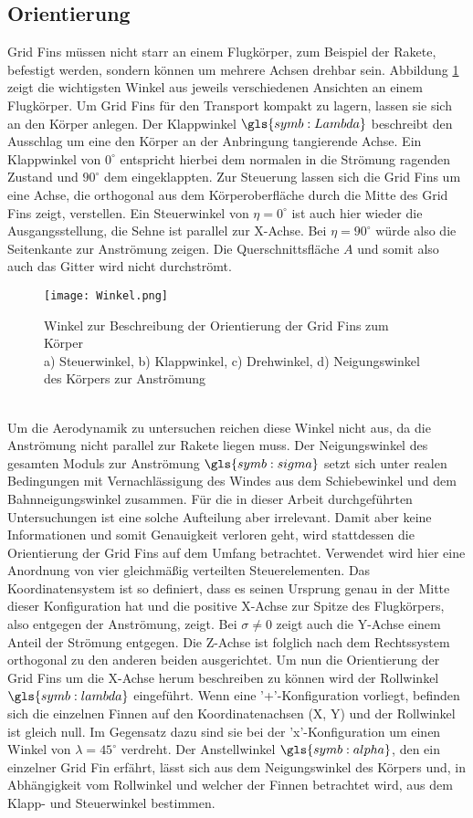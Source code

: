 \subsection{Orientierung}
Grid Fins müssen nicht starr an einem Flugkörper, zum Beispiel der Rakete, befestigt werden, sondern können um mehrere Achsen drehbar sein. Abbildung \ref{abb_winkel} zeigt die wichtigsten Winkel aus jeweils verschiedenen Ansichten an einem Flugkörper. Um Grid Fins für den Transport kompakt zu lagern, lassen sie sich an den Körper anlegen. Der Klappwinkel $\gls{symb:Lambda}$ beschreibt den Ausschlag um eine den Körper an der Anbringung tangierende Achse. Ein Klappwinkel von $0^\circ$ entspricht hierbei dem normalen in die Strömung ragenden Zustand und $90^\circ$ dem eingeklappten. Zur Steuerung lassen sich die Grid Fins um eine Achse, die orthogonal aus dem Körperoberfläche durch die Mitte des Grid Fins zeigt, verstellen. Ein Steuerwinkel von $\eta = 0^\circ$ ist auch hier wieder die Ausgangsstellung, die Sehne ist parallel zur X-Achse. Bei $\eta = 90^\circ$ würde also die Seitenkante zur Anströmung zeigen. Die Querschnittsfläche $A$ und somit also auch das Gitter wird nicht durchströmt.
\begin{figure}[h]
	\centering
	\texttt{[image: Winkel.png]}
	\caption{Winkel zur Beschreibung der Orientierung der Grid Fins zum Körper\\a) Steuerwinkel, b) Klappwinkel, c) Drehwinkel, d) Neigungswinkel des Körpers zur Anströmung}
	\label{abb_winkel}
\end{figure}\\
Um die Aerodynamik zu untersuchen reichen diese Winkel nicht aus, da die Anströmung nicht parallel zur Rakete liegen muss. Der Neigungswinkel des gesamten Moduls zur Anströmung $\gls{symb:sigma}$ setzt sich unter realen Bedingungen mit Vernachlässigung des Windes aus dem Schiebewinkel und dem Bahnneigungswinkel zusammen. Für die in dieser Arbeit durchgeführten Untersuchungen ist eine solche Aufteilung aber irrelevant. Damit aber keine Informationen und somit Genauigkeit verloren geht, wird stattdessen die Orientierung der Grid Fins auf dem Umfang betrachtet. Verwendet wird hier eine Anordnung von vier gleichmäßig verteilten Steuerelementen. Das Koordinatensystem ist so definiert, dass es seinen Ursprung genau in der Mitte dieser Konfiguration hat und die positive X-Achse zur Spitze des Flugkörpers, also entgegen der Anströmung, zeigt. Bei $\sigma \neq 0$ zeigt auch die Y-Achse einem Anteil der Strömung entgegen. Die Z-Achse ist folglich nach dem Rechtssystem orthogonal zu den anderen beiden ausgerichtet. Um nun die Orientierung der Grid Fins um die X-Achse herum beschreiben zu können wird der Rollwinkel $\gls{symb:lambda}$ eingeführt. Wenn eine '+'-Konfiguration vorliegt, befinden sich die einzelnen Finnen auf den Koordinatenachsen (X, Y) und der Rollwinkel ist gleich null. Im Gegensatz dazu sind sie bei der 'x'-Konfiguration um einen Winkel von $\lambda = 45^\circ$ verdreht. Der Anstellwinkel $\gls{symb:alpha}$, den ein einzelner Grid Fin erfährt, lässt sich aus dem Neigungswinkel des Körpers und, in Abhängigkeit vom Rollwinkel und welcher der Finnen betrachtet wird, aus dem Klapp- und Steuerwinkel bestimmen.
\newpage

